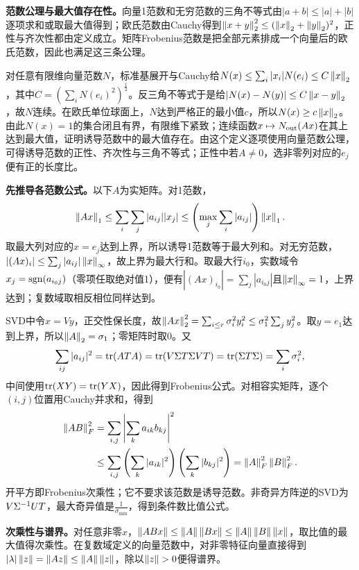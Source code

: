 \label{der:8-6}
\textbf{范数公理与最大值存在性。}向量1范数和无穷范数的三角不等式由$|a+b|\le|a|+|b|$逐项求和或取最大值得到；欧氏范数由Cauchy得到$\left\lVert x+y\right\rVert_2^2\le(\left\lVert x\right\rVert_2+\left\lVert y\right\rVert_2)^2$，正性与齐次性都由定义成立。矩阵Frobenius范数是把全部元素排成一个向量后的欧氏范数，因此也满足这三条公理。

对任意有限维向量范数$N$，标准基展开与Cauchy给$N(x)\le\sum_i|x_i|N(e_i)\le C\left\lVert x\right\rVert_2$，其中$C=(\sum_iN(e_i)^2)^{\frac{1}{2}}$。反三角不等式于是给$|N(x)-N(y)|\le C\left\lVert x-y\right\rVert_2$，故$N$连续。在欧氏单位球面上，$N$达到严格正的最小值$c$，所以$N(x)\ge c\left\lVert x\right\rVert_2$。由此$N(x)=1$的集合闭且有界，有限维下紧致；连续函数$x\mapsto N_{\rm out}(Ax)$在其上达到最大值，证明诱导范数中的最大值存在。由这个定义逐项使用向量范数公理，可得诱导范数的正性、齐次性与三角不等式；正性中若$A\ne0$，选非零列对应的$e_j$便有正的长度比。

\textbf{先推导各范数公式。}以下$A$为实矩阵。对1范数，
\[\left\lVert Ax\right\rVert_1\le\sum_i\sum_j|a_{ij}||x_j|\le\left(\max_j\sum_i|a_{ij}|\right)\left\lVert x\right\rVert_1.\]
取最大列对应的$x=e_j$达到上界，所以诱导1范数等于最大列和。对无穷范数，$|(Ax)_i|\le\sum_j|a_{ij}|\left\lVert x\right\rVert_\infty$，故上界为最大行和。取最大行$i_0$，实数域令$x_j=\operatorname{sgn}(a_{i_0j})$（零项任取绝对值1），便有$|(Ax)_{i_0}|=\sum_j|a_{i_0j}|$且$\left\lVert x\right\rVert_\infty=1$，上界达到；复数域取相反相位同样达到。

SVD中令$x=Vy$，正交性保长度，故$\left\lVert Ax\right\rVert_2^2=\sum_{i\le r}\sigma_i^2y_i^2\le\sigma_1^2\sum_jy_j^2$。取$y=e_1$达到上界，所以$\left\lVert A\right\rVert_2=\sigma_1$；零矩阵时取0。又
\[\sum_{ij}|a_{ij}|^2=\operatorname{tr}(AT A)=\operatorname{tr}(V\Sigma T\Sigma VT)=\operatorname{tr}(\Sigma T\Sigma)=\sum_i\sigma_i^2,\]
中间使用$\operatorname{tr}(XY)=\operatorname{tr}(YX)$，因此得到Frobenius公式。对相容实矩阵，逐个$(i,j)$位置用Cauchy并求和，得到
\[\begin{aligned}
\left\lVert AB\right\rVert_F^2&=\sum_{i,j}\left|\sum_k a_{ik}b_{kj}\right|^2\\
&\le\sum_{i,j}\left(\sum_k|a_{ik}|^2\right)\left(\sum_k|b_{kj}|^2\right)=\left\lVert A\right\rVert_F^2\left\lVert B\right\rVert_F^2.
\end{aligned}\]
开平方即Frobenius次乘性；它不要求该范数是诱导范数。非奇异方阵逆的SVD为$V\Sigma^{-1} UT$，最大奇异值是$\frac{1}{\sigma_{\min}}$，得到条件数比值公式。

\textbf{次乘性与谱界。}对任意非零$x$，$\left\lVert ABx\right\rVert\le\left\lVert A\right\rVert\left\lVert Bx\right\rVert\le\left\lVert A\right\rVert\left\lVert B\right\rVert\left\lVert x\right\rVert$，取比值的最大值得次乘性。在复数域定义的向量范数中，对非零特征向量直接得到$|\lambda|\left\lVert z\right\rVert=\left\lVert Az\right\rVert\le\left\lVert A\right\rVert\left\lVert z\right\rVert$，除以$\left\lVert z\right\rVert>0$便得谱界。

